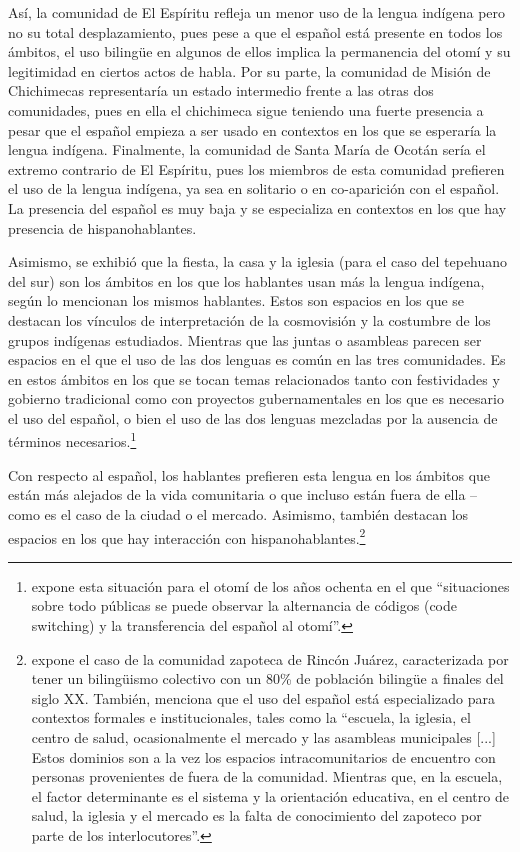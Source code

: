 \documentclass[output=paper]{../langscibook}
\begin{document}
Así, la comunidad de El Espíritu refleja un menor uso de la lengua indígena pero no su total desplazamiento, pues pese a que el español está presente en todos los ámbitos, el uso bilingüe en algunos de ellos implica la permanencia del otomí y su legitimidad en ciertos actos de habla. Por su parte, la comunidad de Misión de Chichimecas representaría un estado intermedio frente a las otras dos comunidades, pues en ella el chichimeca sigue teniendo una fuerte presencia a pesar que el español empieza a ser usado en contextos en los que se esperaría la lengua indígena. Finalmente, la comunidad de Santa María de Ocotán sería el extremo contrario de El Espíritu, pues los miembros de esta comunidad prefieren el uso de la lengua indígena, ya sea en solitario o en co-aparición con el español. La presencia del español es muy baja y se especializa en contextos en los que hay presencia de hispanohablantes.

  Asimismo, se exhibió que la fiesta, la casa y la iglesia (para el caso del tepehuano del sur) son los ámbitos en los que los hablantes usan más la lengua indígena, según lo mencionan los mismos hablantes. Estos son espacios en los que se destacan los vínculos de interpretación de la cosmovisión y la costumbre de los grupos indígenas estudiados. Mientras que las juntas o asambleas parecen ser espacios en el que el uso de las dos lenguas es común en las tres comunidades. Es en estos ámbitos en los que se tocan temas relacionados tanto con festividades y gobierno tradicional como con proyectos gubernamentales en los que es necesario el uso del español, o bien el uso de las dos lenguas mezcladas por la ausencia de términos necesarios.\footnote{\citet[922]{Zimmermann2010} expone esta situación para el otomí de los años ochenta en el que “situaciones sobre todo públicas se puede observar la alternancia de códigos (code switching) y la transferencia del español al otomí”.} 

\largerpage[-2]
Con respecto al español, los hablantes prefieren esta lengua en los ámbitos que están más alejados de la vida comunitaria o que incluso están fuera de ella -- como es el caso de la ciudad o el mercado. Asimismo, también destacan los espacios en los que hay interacción con hispanohablantes.\footnote{\citet[928]{Zimmermann2010} expone el caso de la comunidad zapoteca de Rincón Juárez, caracterizada por tener un bilingüismo colectivo  con un 80\% de población bilingüe a finales del siglo XX. También, menciona que el uso del español está especializado para contextos formales e institucionales, tales como la “escuela, la iglesia, el centro de salud, ocasionalmente el mercado y las asambleas municipales [...] Estos dominios son a la vez los espacios intracomunitarios de encuentro con personas provenientes de fuera de la comunidad. Mientras que, en la escuela, el factor determinante es el sistema y la orientación educativa, en el centro de salud, la iglesia y el mercado es la falta de conocimiento del zapoteco por parte de los interlocutores”.}
\end{document}
